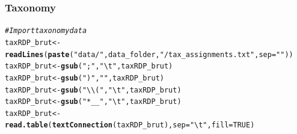 \documentclass[12pt]{article}\usepackage[]{graphicx}\usepackage[]{color}
\makeatletter
\newcommand{\hlnum}[1]{\textcolor[rgb]{0.686,0.059,0.569}{#1}}%
\newcommand{\hlstr}[1]{\textcolor[rgb]{0.192,0.494,0.8}{#1}}%
\newcommand{\hlcom}[1]{\textcolor[rgb]{0.678,0.584,0.686}{\textit{#1}}}%
\newcommand{\hlstd}[1]{\textcolor[rgb]{0.345,0.345,0.345}{#1}}%
\newcommand{\hlkwb}[1]{\textcolor[rgb]{0.69,0.353,0.396}{#1}}%
\newcommand{\hlkwc}[1]{\textcolor[rgb]{0.333,0.667,0.333}{#1}}%
\newcommand{\hlkwd}[1]{\textcolor[rgb]{0.737,0.353,0.396}{\textbf{#1}}}%
\newenvironment{kframe}{%
 \def\at@end@of@kframe{}%
 \ifinner\ifhmode%
  \def\at@end@of@kframe{\end{minipage}}%
  \begin{minipage}{\columnwidth}%
 \fi\fi%
 \def\FrameCommand##1{\hskip\@totalleftmargin \hskip-\fboxsep
 \colorbox{shadecolor}{##1}\hskip-\fboxsep
     \hskip-\linewidth \hskip-\@totalleftmargin \hskip\columnwidth}%
 \MakeFramed {\advance\hsize-\width
   \@totalleftmargin\z@ \linewidth\hsize
   \@setminipage}}%
 {\par\unskip\endMakeFramed%
 \at@end@of@kframe}
\newenvironment{knitrout}{}{} %
\numberwithin{figure}{section}
\makeatother
\begin{document}
  \subsubsection{Taxonomy}
\begin{knitrout}\small
{}\color{fgcolor}\begin{kframe}
\begin{alltt}
\hlcom{#Import taxonomy data}
\hlstd{taxRDP_brut} \hlkwb{<-} \hlkwd{readLines}\hlstd{(}\hlkwd{paste}\hlstd{(}\hlstr{"data/"}\hlstd{, data_folder,} \hlstr{"/tax_assignments.txt"}\hlstd{,} \hlkwc{sep}\hlstd{=}\hlstr{""}\hlstd{))}
\hlstd{taxRDP_brut} \hlkwb{<-} \hlkwd{gsub}\hlstd{(}\hlstr{";"}\hlstd{,} \hlstr{"\textbackslash{}t"}\hlstd{, taxRDP_brut)}
\hlstd{taxRDP_brut} \hlkwb{<-} \hlkwd{gsub}\hlstd{(}\hlstr{")"}\hlstd{,} \hlstr{""}\hlstd{, taxRDP_brut)}
\hlstd{taxRDP_brut} \hlkwb{<-} \hlkwd{gsub}\hlstd{(}\hlstr{"\textbackslash{}\textbackslash{}("}\hlstd{,} \hlstr{"\textbackslash{}t"}\hlstd{, taxRDP_brut)}
\hlstd{taxRDP_brut} \hlkwb{<-} \hlkwd{gsub}\hlstd{(}\hlstr{"*__"}\hlstd{,} \hlstr{"\textbackslash{}t"}\hlstd{, taxRDP_brut)}
\hlstd{taxRDP_brut} \hlkwb{<-} \hlkwd{read.table}\hlstd{(}\hlkwd{textConnection}\hlstd{(taxRDP_brut),} \hlkwc{sep} \hlstd{=} \hlstr{"\textbackslash{}t"}\hlstd{,} \hlkwc{fill} \hlstd{=} \hlnum{TRUE}\hlstd{)}
\end{alltt}
\end{kframe}
\end{knitrout}
\end{document}
